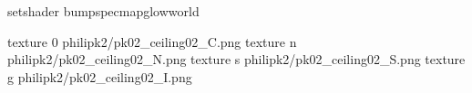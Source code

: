 setshader bumpspecmapglowworld


texture 0 philipk2/pk02_ceiling02_C.png
texture n philipk2/pk02_ceiling02_N.png
texture s philipk2/pk02_ceiling02_S.png
texture g philipk2/pk02_ceiling02_I.png

